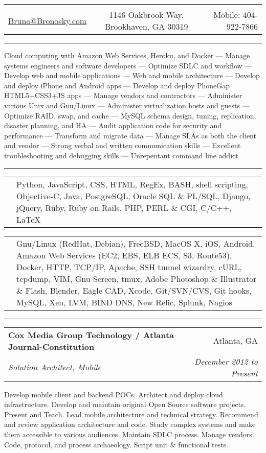 \documentclass[10pt]{article}
\makeatletter
\newcommand{\heading}[4]{
    \begin{center}
    \begin{tabular*}{\textwidth}{@{\extracolsep{\fill}}lcr}
    &\huge{\textbf{\sc{#1}}}&\\
    \href{mailto:#2}{\small #2} & \small #3 & \small Mobile: #4\\
    \hline\hline
    \end{tabular*}
    \end{center}
}
\newcounter{blocktitlechildren}
\newcommand{\blocktitle}[1]{
    \blocktitlechild{4mm}
    \setcounter{blocktitlechildren}{0}
    {{\sc{#1}\vspace{1.5mm}\hrule}\vspace*{1.5mm}}
}
\newcommand{\blocktitlechild}[2][]{
    \ifthenelse{\equal{\value{blocktitlechildren}}{0}}{}{\vspace{#2}#1}
    \addtocounter{blocktitlechildren}{1}
}
\newcommand{\skillnew}[2]{
    \blocktitlechild{1mm}
    \begin{tabular}
        {p{2cm}p{17cm}}
        \noindent\raggedright{\skillfont{#1}} & #2
    \end{tabular}
}
\newcommand{\sectionheader}[4]{
    \blocktitlechild{2mm}
    \begin{tabular*}{\textwidth}{l@{\extracolsep{\fill}}r}
    \textbf{#1} & #2\\
    \emph{#3} & \emph{#4}
    \end{tabular*}
}
\newenvironment{longtext}[1]{\small {#1}}
\makeatother
\begin{document}
\heading{Bruno Bronosky}
{Bruno@Bronosky.com}
{1146 Oakbrook Way, Brookhaven, GA 30319}
{404-922-7866}

\blocktitle{Overview}
\blocktitlechild{2mm}
\begin{longtext}
    Cloud computing with Amazon Web Services, Heroku, and Docker ---
    Manage systems engineers and software developers ---
    Optimize SDLC and workflow ---
    Develop web and mobile applications ---
    Web and mobile architecture ---
    Develop and deploy iPhone and Android apps ---
    Develop and deploy PhoneGap HTML5+CSS3+JS apps ---
    Manage vendors and contractors ---
    Administer various Unix and Gnu/Linux ---
    Administer virtualization hosts and guests ---
    Optimize RAID, swap, and cache ---
    MySQL schema design, tuning, replication, disaster planning, and HA ---
    Audit application code for security and performance ---
    Transform and migrate data ---
    Manage SLAs as both the client and vendor ---
    Strong verbal and written communication skills ---
    Excellent troubleshooting and debugging skills ---
    Unrepentant command line addict
\end{longtext}

\blocktitle{Skills}
\skillnew{Languages \& Frameworks}{
    Python,
    JavaScript,
    CSS,
    HTML,
    RegEx,
    BASH,
    shell scripting,
    Objective-C,
    Java,
    PostgreSQL,
    Oracle SQL \& PL/SQL,
    Django,
    jQuery,
    Ruby,
    Ruby on Rails,
    PHP,
    PERL \& CGI,
    C/C++,
    \LaTeX
}

\skillnew{Systems \& Software}{
    Gnu/Linux (RedHat, Debian),
    FreeBSD,
    MacOS X,
    iOS,
    Android,
    Amazon Web Services (EC2, EBS, ELB ECS, S3, Route53),
    Docker,
    HTTP,
    TCP/IP,
    Apache,
    SSH tunnel wizardry,
    cURL,
    tcpdump,
    VIM,
    Gnu Screen,
    tmux,
    Adobe Photoshop \& Illustrator \& Flash,
    Blender,
    Eagle CAD,
    Xcode,
    Git/SVN/CVS,
    Git hooks,
    MySQL,
    Xen,
    LVM,
    BIND DNS,
    New Relic,
    Splunk,
    Nagios
}

\blocktitle{Experience}
\sectionheader
{Cox Media Group Technology / Atlanta Journal-Constitution}
{Atlanta, GA}
{Solution Architect, Mobile}
{December 2012 to Present}
\begin{longtext}
Develop mobile client and backend POCs.
Architect and deploy cloud infrastructure.
Develop and maintain original Open Source software projects.
Present and Teach.
Lead mobile architecture and technical strategy.
Recommend and review application architecture and code.
Study complex systems and make them accessible to various audiences.
Maintain SDLC process.
Manage vendors.
Code, protocol, and process archaeology.
Script unit \& functional tests.
\end{longtext}
\end{document}
